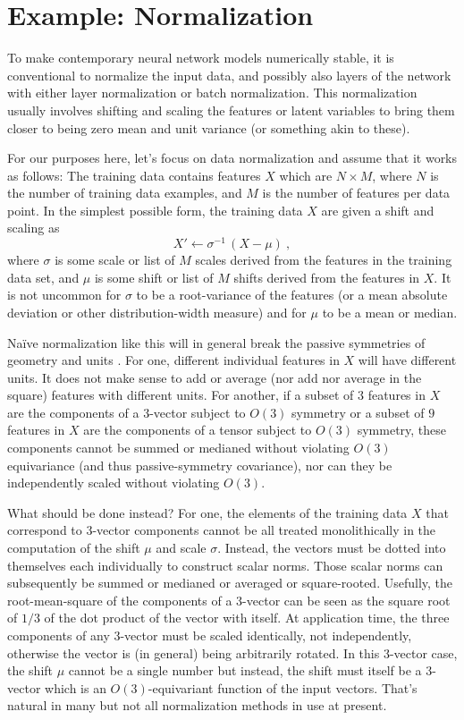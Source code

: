 \documentclass[]{article} %
\begin{document}
\section{Example: Normalization}\label{sec:norm}
To make contemporary neural network models numerically stable, it is conventional to normalize the input data, and possibly also layers of the network with either layer normalization or batch normalization.
This normalization usually involves shifting and scaling the features or latent variables to bring them closer to being zero mean and unit variance (or something akin to these).

For our purposes here, let's focus on data normalization and assume that it works as follows:
The training data contains features $X$ which are $N\times M$, where $N$ is the number of training data examples, and $M$ is the number of features per data point.
In the simplest possible form, the training data $X$ are given a shift and scaling as
\begin{equation}
    X' \leftarrow \sigma^{-1}\,(X - \mu) ~,
\end{equation}
where $\sigma$ is some scale or list of $M$ scales derived from the features in the training data set, and $\mu$ is some shift or list of $M$ shifts derived from the features in $X$.
It is not uncommon for $\sigma$ to be a root-variance of the features (or a mean absolute deviation or other distribution-width measure) and for $\mu$ to be a mean or median.

Na\"ive normalization like this will in general break the passive symmetries of geometry and units \citep{aalto2022geometric}.
For one, different individual features in $X$ will have different units.
It does not make sense to add or average (nor add nor average in the square) features with different units.
For another, if a subset of $3$ features in $X$ are the components of a 3-vector subject to $O(3)$ symmetry or a subset of $9$ features in $X$ are the components of a tensor subject to $O(3)$ symmetry, these components cannot be summed or medianed without violating $O(3)$ equivariance (and thus passive-symmetry covariance), nor can they be independently scaled without violating $O(3)$.

What should be done instead?
For one, the elements of the training data $X$ that correspond to 3-vector components cannot be all treated monolithically in the computation of the shift $\mu$ and scale $\sigma$.
Instead, the vectors must be dotted into themselves each individually to construct scalar norms.
Those scalar norms can subsequently be summed or medianed or averaged or square-rooted.
Usefully, the root-mean-square of the components of a 3-vector can be seen as the square root of $1/3$ of the dot product of the vector with itself.
At application time, the three components of any 3-vector must be scaled identically, not independently, otherwise the vector is (in general) being arbitrarily rotated.
In this 3-vector case, the shift $\mu$ cannot be a single number but instead, the shift must itself be a 3-vector which is an $O(3)$-equivariant function of the input vectors.
That's natural in many but not all normalization methods in use at present.
\end{document}
